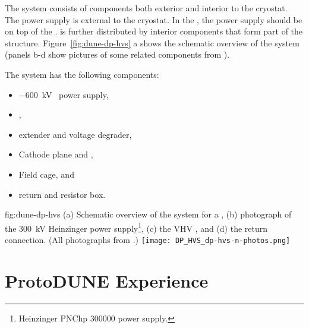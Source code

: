 The  system consists of components both exterior and interior to the cryostat. The  power supply is external to the cryostat.  In the , the  power supply should be on top of the  \fdth.  is further distributed by interior components that form part of the  structure. Figure~\ref{fig:dune-dp-hvs} a shows the schematic overview of the  system (panels b-d show pictures of some related components from ).

The \dual {} system has the following components:

\begin{itemize}
\item \SI{-600}{kV} \  power supply,
\item {} \fdth,
\item {} extender and voltage degrader,
\item Cathode plane and , 
\item Field cage, and
\item {} return \fdth and resistor box.
\end{itemize}

\begin{dunefigure}
{fig:dune-dp-hvs}
{(a) Schematic overview of the  system for a \dpmod{}, 
(b) photograph of the \SI{300}{\kV} Heinzinger power supply\footnote{Heinzinger\texttrademark{} PNChp 300000 power supply.}, (c) the VHV \fdth{}, and (d) the  return connection. (All photographs from .)}
\texttt{[image: DP\_HVS\_dp-hvs-n-photos.png]}
\end{dunefigure}


\clearpage
\section{ProtoDUNE Experience}
\label{sec:fddp-hv-protodune}
\label{sec:fddp-hv-protodune-summary}

